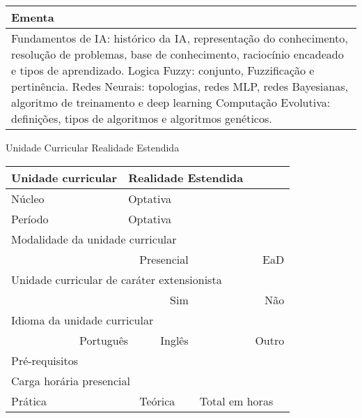 \begin{quadro}[ht!]
\begin{tabular}{|p{3cm} p{2cm} p{3cm} p{2cm} p{3cm} p{2cm}|}
\multicolumn{6}{|p{15cm}|}{\cellcolor{blue1} Ementa} \\\hline
\hline\multicolumn{6}{|p{15cm}|}{\scriptsize Fundamentos de IA: histórico da IA, representação do conhecimento, resolução de problemas, base de conhecimento, raciocínio encadeado e tipos de aprendizado. Logica Fuzzy: conjunto, Fuzzificação e pertinência. Redes Neurais: topologias, redes MLP, redes Bayesianas, algoritmo de treinamento e deep learning Computação Evolutiva: definições, tipos de algoritmos e algoritmos genéticos.}\\\hline 
\hline
	\end{tabular}
\end{quadro}


\begin{quadro}[ht!]
  \centering\scriptsize
\caption{Unidade Curricular Realidade Estendida}
\label{unit_49}
\begin{tabular}{|p{3cm} p{2cm} p{3cm} p{2cm} p{3cm} p{2cm}|}\hline
\multicolumn{1}{|p{3cm}|}{\cellcolor{blue1} Unidade curricular} & \multicolumn{5}{p{9cm}|}{Realidade Estendida}\\\hline
\multicolumn{1}{|p{3cm}|}{\cellcolor{blue1} Núcleo} & \multicolumn{5}{p{11.5cm}|}{Optativa}\\\hline
\multicolumn{1}{|p{3cm}|}{\cellcolor{blue1} Período} & \multicolumn{5}{p{9cm}|}{Optativa}\\\hline
\multicolumn{6}{|p{15cm}|}{\cellcolor{blue1} Modalidade da unidade curricular} \\\hline
\multicolumn{2}{|r}{		} &  \multicolumn{2}{r}{Presencial \Square} & \multicolumn{2}{r|}{EaD \XBox	} \\\hline
\multicolumn{6}{|p{15cm}|}{\cellcolor{blue1} Unidade curricular de caráter extensionista} \\\hline
\multicolumn{4}{|r}{			Sim \Square	} & \multicolumn{2}{r|}{	Não \XBox	}\\\hline
\multicolumn{6}{|p{15cm}|}{\cellcolor{blue1} Idioma da unidade curricular} \\ \hline
\multicolumn{2}{|r}{	Português \XBox	} &  \multicolumn{2}{r}{	Inglês \Square	} & \multicolumn{2}{r|}{	Outro \Square	} \\ \hline
\multicolumn{1}{|p{3cm}|}{\cellcolor{blue1} Pré-requisitos} & \multicolumn{5}{p{9cm}|}{}\\ \hline
\multicolumn{6}{|p{15cm}|}{\cellcolor{blue1} Carga horária presencial} \\ \hline
\multicolumn{1}{|p{3cm}|}{\raggedleft Prática} & \multicolumn{1}{p{1cm}|}{\centering	30	} &  \multicolumn{1}{p{3cm}|}{\raggedleft Teórica}  & \multicolumn{1}{p{1cm}|}{\centering 	30	} & \multicolumn{1}{p{3cm}|}{\raggedleft Total em horas} & \multicolumn{1}{p{1cm}|}{\raggedleft	60	} \\ \hline 

\end{tabular}
\end{quadro}
